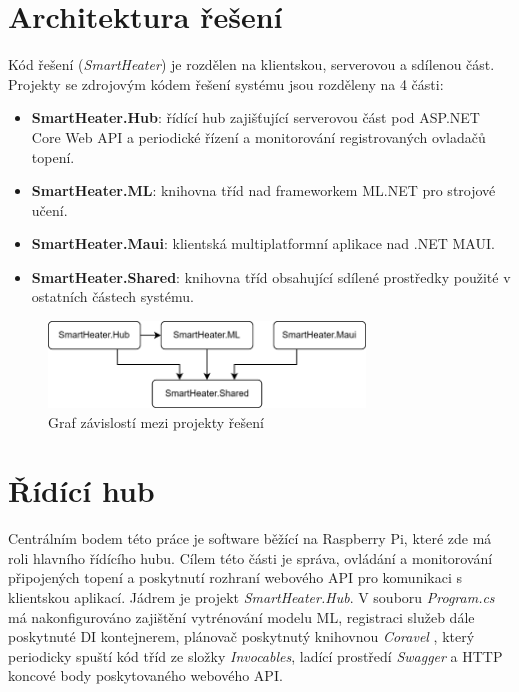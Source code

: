 \section{Architektura řešení}
Kód řešení ({\it SmartHeater}) je rozdělen na klientskou, serverovou a sdílenou část. Projekty se zdrojovým kódem řešení systému jsou rozděleny na 4 části:
\begin{itemize}
    \item \textbf{SmartHeater.Hub}: řídící hub zajišťující serverovou část pod ASP.NET Core Web API a periodické řízení a monitorování registrovaných ovladačů topení.
    \item \textbf{SmartHeater.ML}: knihovna tříd nad frameworkem ML.NET pro strojové učení.
    \item \textbf{SmartHeater.Maui}: klientská multiplatformní aplikace nad .NET MAUI.
    \item \textbf{SmartHeater.Shared}: knihovna tříd obsahující sdílené prostředky použité v ostatních částech systému.
\end{itemize}

\begin{figure}[hbt]
\centering
\includegraphics[width=0.75\textwidth]{obrazky-figures/smartheater-architecture.png}
\caption{Graf závislostí mezi projekty řešení}
\end{figure}

\pagebreak

\section{Řídící hub}
Centrálním bodem této práce je software běžící na Raspberry Pi, které zde má roli hlavního řídícího hubu. Cílem této části je správa, ovládání a monitorování připojených topení a poskytnutí rozhraní webového API pro komunikaci s klientskou aplikací. Jádrem je projekt {\it SmartHeater.Hub}. V souboru {\it Program.cs} má nakonfigurováno zajištění vytrénování modelu ML, registraci služeb dále poskytnuté DI kontejnerem, plánovač poskytnutý knihovnou {\it Coravel} \cite{coravel}, který periodicky spuští kód tříd ze složky {\it Invocables}, ladící prostředí {\it Swagger} a HTTP koncové body poskytovaného webového API.

